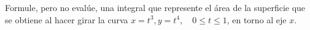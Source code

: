 \item Formule, pero no evalúe, una integral que represente el área de la superficie que se obtiene al hacer girar la curva $x = t^3, y = t^4, \quad 0 \le t \le 1$, en torno al eje $x$.
